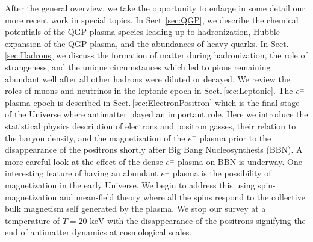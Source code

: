\documentclass[universe,article,submit,moreauthors,pdftex,a4paper]{Definitions/mdpi}
\newcommand{\keV}{\text{ keV}}
\newcommand*{\rsec}[1]{Sect.\,{\ref{#1}}}
\begin{document}
After the general overview, we take the opportunity to enlarge in some detail our more recent work in special topics. In \rsec{sec:QGP}, we describe the chemical potentials of the QGP plasma species leading up to hadronization, Hubble expansion of the QGP plasma, and the abundances of heavy quarks. In \rsec{sec:Hadrons} we discuss the formation of matter during hadronization, the role of strangeness, and the unique circumstances which led to pions remaining abundant well after all other hadrons were diluted or decayed. We review the roles of muons and neutrinos in the leptonic epoch in \rsec{sec:Leptonic}. The $e^{\pm}$ plasma epoch is described in \rsec{sec:ElectronPositron} which is the final stage of the Universe where antimatter played an important role. Here we introduce the statistical physics description of electrons and positron gasses, their relation to the baryon density, and the magnetization of the $e^{\pm}$ plasma prior to the disappearance of the positrons shortly after Big Bang Nucleosynthesis (BBN). A more careful look at the effect of the dense $e^{\pm}$ plasma on BBN is underway. One interesting feature of having an abundant $e^{\pm}$ plasma is the possibility of magnetization in the early Universe. We begin to address this using spin-magnetization and mean-field theory where all the spins respond to the collective bulk magnetism self generated by the plasma. We stop our survey at a temperature of $T=20\keV$ with the disappearance of the positrons signifying the end of antimatter dynamics at cosmological scales.
\end{document}
